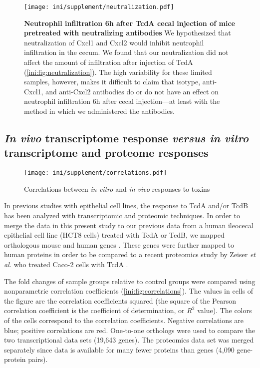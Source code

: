 \begin{figure}[ht]
\centering
\texttt{[image: ini/supplement/neutralization.pdf]}
\caption[Neutrophil infiltration 6h after TcdA cecal injection 
           of mice pretreated with neutralizing antibodies]
           {\textbf{Neutrophil infiltration 6h after TcdA cecal injection 
           of mice pretreated with neutralizing antibodies}
           We hypothesized that neutralization of Cxcl1 and Cxcl2
would inhibit neutrophil infiltration in the cecum. We found that 
our neutralization did not affect the amount of infiltration after injection
of TcdA (\autoref{ini:fig:neutralization}). The high variability for these 
limited samples, however,
makes it difficult to claim that isotype, anti-Cxcl1, and anti-Cxcl2 antibodies
do or do not have an effect on neutrophil infiltration 6h after cecal injection---at 
least with the method in which we administered the antibodies.
           }
\label{ini:fig:neutralization}
\end{figure}


\subsection{\emph{In vivo} transcriptome response \emph{versus
            in vitro} transcriptome and proteome responses}

\begin{figure}[b!]
\centering
\texttt{[image: ini/supplement/correlations.pdf]}
\caption{Correlations between \emph{in vitro} and \emph{in vivo} responses to toxins}
\label{ini:fig:correlations}
\end{figure}

In previous studies with epithelial cell lines, the response 
to TcdA and/or TcdB has been analyzed with transcriptomic and 
proteomic techniques. In order to merge the data in this present study
to our previous data from a human ileocecal epithelial
cell line (HCT8 cells) treated with TcdA or TcdB, we mapped orthologous
mouse and human genes \cite{DAuria:2012bd}. These genes were further mapped
to human proteins in order to be compared to a recent proteomics study
by Zeiser \emph{et al.} who treated Caco-2 cells with TcdA \cite{Zeiser:2013cu}.

The fold changes of sample groups relative
to control groups were compared using nonparametric correlation
coefficients (\autoref{ini:fig:correlations}). The values in cells of the figure
are the correlation coefficients squared (the square of the Pearson
correlation coefficient is the coefficient of determination, or $R^2$ value).
The colors of the cells correspond to the correlation coefficients. Negative
correlations are blue; positive correlations are red.
One-to-one orthologs were used to compare the two
transcriptional data sets (19,643 genes). The proteomics data
set was merged separately since data is available for many fewer
proteins than genes (4,090 gene-protein pairs).

